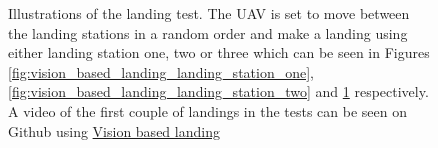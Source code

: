 \documentclass[../Head/report.tex]{subfiles}
\begin{document}
\begin{figure}[H]
\begin{subfigure}[t]{.30\textwidth}
        \caption{}
        \label{fig:vision_based_landing_landing_station_three}
    \end{subfigure}
    \caption{Illustrations of the landing test. The UAV is set to move between the landing stations in a random order and make a landing using either landing station one, two or three which can be seen in Figures \ref{fig:vision_based_landing_landing_station_one}, \ref{fig:vision_based_landing_landing_station_two} and \ref{fig:vision_based_landing_landing_station_three} respectively. A video of the first couple of landings in the tests can be seen on Github using \href{https://github.com/Kenil16/master_project/tree/master/test_videos/vision_landing_precision_and_accuracy_vertical_vel_0.5_max_error_0.05}{Vision based landing}}
    \label{fig:vision_based_landing_landing_stations}
\end{figure}  
\end{document}
